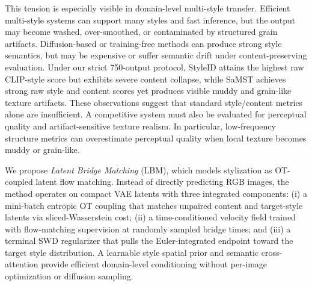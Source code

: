 ﻿\documentclass[letterpaper]{article}
\begin{document}
This tension is especially visible in domain-level multi-style transfer. Efficient multi-style systems can support many styles and fast inference, but the output may become washed, over-smoothed, or contaminated by structured grain artifacts. Diffusion-based or training-free methods can produce strong style semantics, but may be expensive or suffer semantic drift under content-preserving evaluation. Under our strict 750-output protocol, StyleID attains the highest raw CLIP-style score but exhibits severe content collapse, while SaMST achieves strong raw style and content scores yet produces visible muddy and grain-like texture artifacts. These observations suggest that standard style/content metrics alone are insufficient. A competitive system must also be evaluated for perceptual quality and artifact-sensitive texture realism. In particular, low-frequency structure metrics can overestimate perceptual quality when local texture becomes muddy or grain-like.

We propose \emph{Latent Bridge Matching} (LBM), which models stylization as OT-coupled latent flow matching. Instead of directly predicting RGB images, the method operates on compact VAE latents with three integrated components: (i) a mini-batch entropic OT coupling that matches unpaired content and target-style latents via sliced-Wasserstein cost; (ii) a time-conditioned velocity field trained with flow-matching supervision at randomly sampled bridge times; and (iii) a terminal SWD regularizer that pulls the Euler-integrated endpoint toward the target style distribution. A learnable style spatial prior and semantic cross-attention provide efficient domain-level conditioning without per-image optimization or diffusion sampling.
\end{document}
